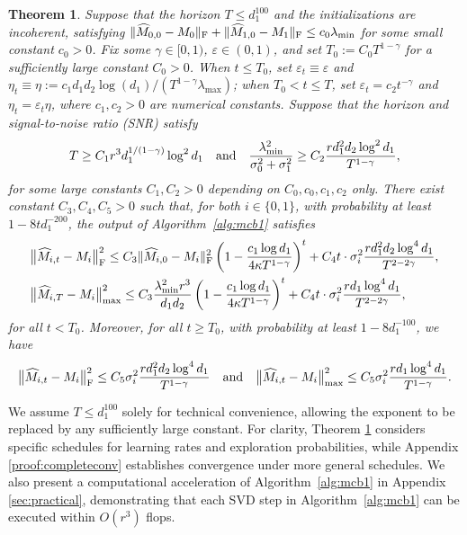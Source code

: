 \documentclass[12pt]{article}
\newcommand\fro[1]{\| #1 \|_{\rm{F}}}
\def\hat{\widehat}
\def\eps{\varepsilon}
\newtheorem{Theorem}{Theorem}
\theoremstyle{plain}
\begin{document}
\begin{Theorem} \label{thm:MCB-conv}
Suppose that the horizon $T\leq d_1^{100}$ and the initializations are incoherent, satisfying $\|\hat M_{0,0}-M_0\|_{\rm F}+\|\hat M_{1,0}-M_1\|_{\rm F}\leq c_0\lambda_{\min}$ for some small constant $c_0>0$.
Fix some $\gamma\in [0,1)$, $\eps\in(0, 1)$, and set $T_0:=C_0T^{1-\gamma}$ for a sufficiently large constant $C_0>0$.  When $t\leq T_0$, set $\eps_t\equiv\eps$ and $\eta_t\equiv \eta:=c_1d_1d_2\log(d_1)/(T^{1-\gamma}\lambda_{\max})$; when $T_0<t\leq T$, set $\eps_t=c_2t^{-\gamma}$ and $\eta_t=\eps_t \eta$, where $c_1, c_2>0$ are numerical constants. Suppose that the horizon and signal-to-noise ratio (SNR) satisfy
$$
T\geq C_1r^3d_1^{1/(1-\gamma)} \log^2 d_1\quad {\rm and}\quad  \frac{\lambda_{\min}^2}{\sigma_0^2+\sigma_1^2}\geq C_2\frac{rd_1^2d_2\log^2d_1}{T^{1-\gamma}},
$$
for some large constants $C_1, C_2>0$ depending on $C_0, c_0,  c_1,c_2$ only. There exist constant $C_3,C_4,C_5 >0$ such that, for both $i\in\{0,1\}$, with probability at least $1-8td_1^{-200}$, the output of Algorithm~\ref{alg:mcb1} satisfies 
    \begin{align*}
        &\big\|\hat M_{i, t} - M_i \big\|_{\rm F}^2\leq C_3\fro{\widehat{M}_{i,0}-M_i}^2 \left(1-\frac{c_1\log d_1}{4\kappa T^{1-\gamma}}\right)^t + C_4t\cdot \sigma_i^2\frac{rd_1^2d_2\log^4 d_1}{T^{2-2\gamma}}, \\
        &\big\|\hat M_{i,T} - M_i\big\|_{\max}^2\leq  C_3\frac{\lambda_{\min}^2r^3}{d_1d_2} \left(1-\frac{c_1\log d_1}{4\kappa T^{1-\gamma}}\right)^t +   C_4t\cdot \sigma_i^2\frac{rd_1\log^4 d_1}{T^{2-2\gamma}},
    \end{align*}
for all $t<T_0$.  Moreover, for all $t\geq T_0$, with probability at least $1-8d_1^{-100}$, we have 
    \begin{align*}
        \big\|\hat M_{i, t} - M_i \big\|_{\rm F}^2\leq C_5\sigma_i^2\frac{rd_1^2d_2\log^4 d_1}{T^{1-\gamma}} \quad {\rm and}\quad 
        \big\|\hat M_{i,t} - M_i\big\|_{\max}^2\leq C_5\sigma_i^2\frac{rd_1\log^4 d_1}{T^{1-\gamma}}.
    \end{align*} 
\end{Theorem} 

We assume $T\leq d_1^{100}$ solely for technical convenience, allowing the exponent to be replaced by any sufficiently large constant. For clarity, Theorem \ref{thm:MCB-conv} considers specific schedules for learning rates and exploration probabilities, while Appendix \ref{proof:completeconv} establishes convergence under more general schedules.  We also present a computational acceleration of Algorithm~\ref{alg:mcb1} in Appendix \ref{sec:practical}, demonstrating that each SVD step in Algorithm~\ref{alg:mcb1} can be executed within $O(r^3)$ flops.   
\end{document}
